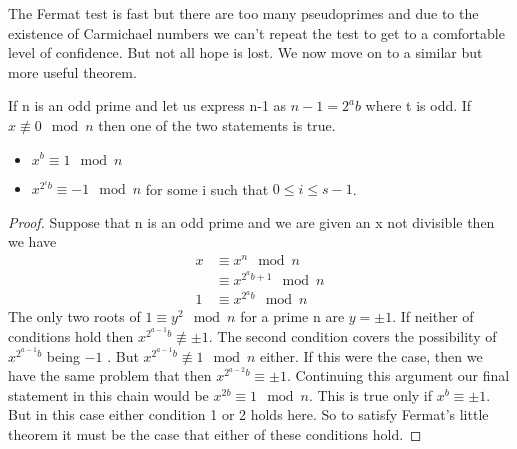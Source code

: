 \documentclass{article}
\begin{document}
The Fermat test is fast but there are too many pseudoprimes and due to the existence of Carmichael numbers we can't repeat the test to get to a comfortable level of confidence.  But not all hope is lost. We now move on to a similar but more useful theorem. 
\begin{theorem}
\label{strongpseudo}
If n is an odd prime and let us express n-1 as $n - 1 = 2^a b$ where t is odd. If $ x \not \equiv 0 \mod n$ then one of the two statements is true.
    \begin{itemize}
        \item $x^b \equiv 1 \mod n$ 
        \item $x^{2^i b} \equiv -1 \mod n$ for some i such that $0 \leq i \leq s -1$.
    \end{itemize}
\end{theorem}
\begin{proof}
Suppose that n is an odd prime and we are given an x not divisible then we have
\begin{align*}
    x &\equiv x^n \mod n \\
    &\equiv x^{2^a b + 1} \mod n \\
    1 &\equiv x^{2^a b} \mod n
\end{align*}
The only two roots of $1 \equiv y^2 \mod n$ for a prime n are $y = \pm 1$. If neither of conditions hold then $x^{2^{a-1} b} \not \equiv \pm 1$. The second condition covers the possibility of $x^{2^{a-1} b}$ being $ -1$ . But $x^{2^{a-1} b} \not \equiv 1 \mod n$ either. If this were the case, then we have the same problem that then $x^{2^{a-2} b} \equiv \pm 1$. Continuing this argument our final statement in this chain would be $x^{2 b} \equiv 1 \mod n$. This is true only if $x^b \equiv \pm 1$. But in this case either condition 1 or 2 holds here. So to satisfy Fermat's little theorem it must be the case that either of these conditions hold. 
\end{proof}
\end{document}
